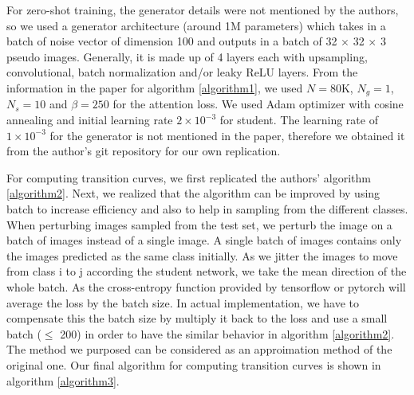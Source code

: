 \documentclass{article}
\begin{document}
For zero-shot training, the generator details were not mentioned by the authors, so we used a generator architecture (around 1M parameters) which takes in a batch of noise vector of dimension 100 and outputs in a batch of 32 $\times$ 32 $\times$ 3 pseudo images. Generally, it is made up of 4 layers each with upsampling, convolutional, batch normalization and/or leaky ReLU layers. From the information in the paper for algorithm \ref{algorithm1}, we used $N=80$K, $N_g=1$, $N_s=10$ and $\beta=250$ for the attention loss. We used Adam optimizer with cosine annealing and initial learning rate $2\times10^{-3}$ for student. The learning rate of $1\times10^{-3}$ for the generator is not mentioned in the paper, therefore we obtained it from the author's git repository for our own replication.

For computing transition curves, we first replicated the authors' algorithm \ref{algorithm2}. Next, we realized that the algorithm can be improved by using batch to increase efficiency and also to help in sampling from the different classes. When perturbing images sampled from the test set, we perturb the image on a batch of images instead of a single image. A single batch of images contains only the images predicted as the same class initially. As we jitter the images to move from class i to j according the student network, we take the mean direction of the whole batch. As the cross-entropy function provided by tensorflow or pytorch will average the loss by the batch size. In actual implementation, we have to compensate this the batch size by multiply it back to the loss and use a small batch ($\leq$ 200) in order to have the similar behavior in algorithm \ref{algorithm2}. The method we purposed can be considered as an approimation method of the original one. Our final algorithm for computing transition curves is shown in algorithm \ref{algorithm3}.
\end{document}
